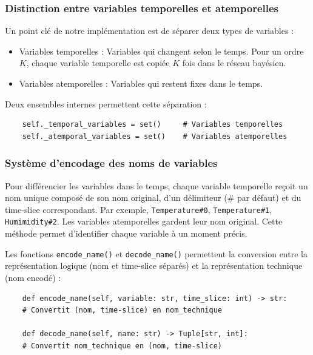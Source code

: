 \documentclass{article}
\begin{document}
\subsubsection{Distinction entre variables temporelles et atemporelles}

Un point clé de notre implémentation est de séparer deux types de variables :

\begin{itemize}
    \item Variables temporelles : Variables qui changent selon le temps. Pour un ordre $K$, chaque variable
          temporelle est copiée $K$ fois dans le réseau bayésien.
    \item Variables atemporelles : Variables qui restent fixes dans le temps.
\end{itemize}

Deux ensembles internes permettent cette séparation :

\begin{lstlisting}
    self._temporal_variables = set()     # Variables temporelles
    self._atemporal_variables = set()    # Variables atemporelles
\end{lstlisting}


\subsubsection{Système d'encodage des noms de variables}

Pour différencier les variables dans le temps, chaque variable temporelle reçoit un nom unique composé de son nom
original, d'un délimiteur (\# par défaut)  et du time-slice correspondant. Par exemple, \texttt{Temperature\#0},
\texttt{Temperature\#1}, \texttt{Humimidity\#2}. Les variables atemporelles gardent leur nom original. Cette méthode
permet d'identifier chaque variable à un moment précis.

Les fonctions \texttt{encode\_name()} et \texttt{decode\_name()} permettent la conversion entre la représentation
logique (nom et time-slice séparés) et la représentation technique (nom encodé) :

\begin{lstlisting}    
    def encode_name(self, variable: str, time_slice: int) -> str:
    # Convertit (nom, time-slice) en nom_technique
    
    def decode_name(self, name: str) -> Tuple[str, int]:
    # Convertit nom_technique en (nom, time-slice)
\end{lstlisting}
\end{document}
